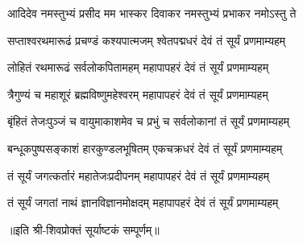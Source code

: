 

\twolineshloka
{आदिदेव नमस्तुभ्यं प्रसीद मम भास्कर}
{दिवाकर नमस्तुभ्यं प्रभाकर नमोऽस्तु ते} %

\twolineshloka
{सप्ताश्वरथमारूढं प्रचण्डं कश्यपात्मजम्}
{श्वेतपद्मधरं देवं तं सूर्यं प्रणमाम्यहम्} %

\twolineshloka
{लोहितं रथमारूढं सर्वलोकपितामहम्}
{महापापहरं देवं तं सूर्यं प्रणमाम्यहम्} %

\twolineshloka
{त्रैगुण्यं च महाशूरं ब्रह्मविष्णुमहेश्वरम्}
{महापापहरं देवं तं सूर्यं प्रणमाम्यहम्} %

\twolineshloka
{बृंहितं तेजःपुञ्जं च वायुमाकाशमेव च}
{प्रभुं च सर्वलोकानां तं सूर्यं प्रणमाम्यहम्} %

\twolineshloka
{बन्धूकपुष्पसङ्काशं हारकुण्डलभूषितम्}
{एकचक्रधरं देवं तं सूर्यं प्रणमाम्यहम्} %

\twolineshloka
{तं सूर्यं जगत्कर्तारं महातेजःप्रदीपनम्}
{महापापहरं देवं तं सूर्यं प्रणमाम्यहम्} %

\twolineshloka
{तं सूर्यं जगतां नाथं ज्ञानविज्ञानमोक्षदम्}
{महापापहरं देवं तं सूर्यं प्रणमाम्यहम्} %

॥इति श्री-शिवप्रोक्तं सूर्याष्टकं सम्पूर्णम्॥
